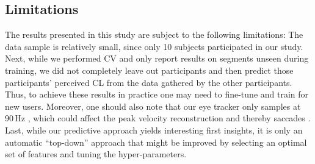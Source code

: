 \documentclass[output=paper]{langsci/langscibook}
\begin{document}
\subsection{Limitations}
The results presented in this study are subject to the following limitations: The data sample is relatively small, since only 10 subjects participated in our study.
Next, while we performed CV and only report results on segments unseen during training, we did not completely leave out participants and then predict those participants' perceived CL from the data gathered by the other participants. Thus, to achieve these results in practice one may need to fine-tune and train for new users. %
Moreover, %
one should also note that our eye tracker only samples at 90\,Hz%
, which could affect the peak velocity reconstruction and thereby saccades \citep{mack2017effect}.
Last, while our predictive approach yields interesting first insights, it is only an automatic ``top-down'' approach that might be improved by selecting an optimal set of features and tuning the hyper-parameters.

\end{document}
